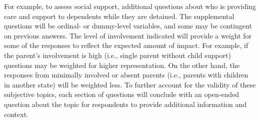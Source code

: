 \documentclass[
  letterpaper,
  DIV=11,
  numbers=noendperiod]{scrartcl}
\begin{document}
For example, to assess social support, additional questions about who is
providing care and support to dependents while they are detained. The
supplemental questions will be ordinal- or dummy-level variables, and
some may be contingent on previous answers. The level of involvement
indicated will provide a weight for some of the responses to reflect the
expected amount of impact. For example, if the parent's involvement is
high (i.e., single parent without child support) questions may be
weighted for higher representation. On the other hand, the responses
from minimally involved or absent parents (i.e., parents with children
in another state) will be weighted less. To further account for the
validity of these subjective topics, each section of questions will
conclude with an open-ended question about the topic for respondents to
provide additional information and context.
\end{document}
